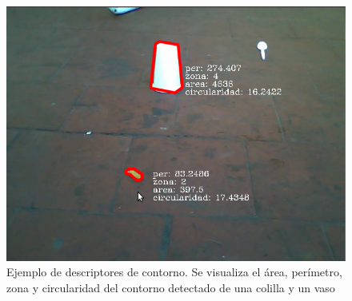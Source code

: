 \begin{figure}[tpb]
\begin{center}
  \includegraphics[scale=0.4]{figuras/filtros.png}
\end{center}
  \caption{\small Ejemplo de descriptores de contorno. Se visualiza el área, perímetro, zona y circularidad del contorno 
  detectado de una colilla y un vaso}
  \label{fig:erode}
\end{figure}

